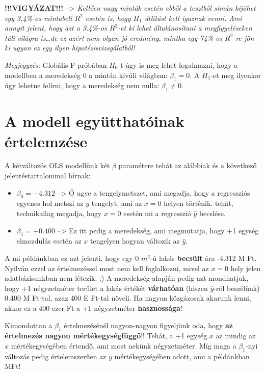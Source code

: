 \documentclass[
]{book}
\providecommand{\tightlist}{%
  \setlength{\itemsep}{0pt}\setlength{\parskip}{0pt}}
\begin{document}
\textbf{!!!VIGYÁZAT!!!} --\textgreater{} \emph{Kellően nagy minták esetén ebből a tesztből simán kijöhet egy 3,4\%-os mintabeli \(R^2\) esetén is, hogy \(H_1\) állítást kell igaznak venni. Ami annyit jelent, hogy azt a 3.4\%-os \(R^2\)-et ki lehet általánosítani a megfigyeléseken túli világra is\ldots de ez azért nem olyan jó eredmény, mintha egy 74\%-os \(R^2\)-re jön ki ugyan ez egy ilyen hipotézisvizsgálatból!}

\emph{Megjegyzés}: Globális F-próbában \(H_0\)-t úgy is meg lehet fogalmazni, hogy a modellben a meredekség 0 a mintán kívüli világban: \(\beta_1=0\). A \(H_1\)-et meg ilyenkor úgy lehetne felírni, hogy a meredekség nem nulla: \(\beta_1\neq0\).

\section{A modell együtthatóinak értelemzése}\label{a-modell-egyuxfctthatuxf3inak-uxe9rtelemzuxe9se}

A kétváltozós OLS modellünk két \(\beta\) paramétere tehát az alábbiak és a következő jelentéstartalommal bírnak:

\begin{itemize}
\tightlist
\item
  \(\beta_0=-4.312\) --\textgreater{} Ő ugye a tengelymetszet, ami megadja, hogy a regressziós egyenes hol metszi az \(y\) tengelyt, ami az \(x=0\) helyen történik. tehát, technikailag megadja, hogy \(x=0\) esetén mi a regresszió \(\hat{y}\) becslése.
\item
  \(\beta_1=+0.400\) --\textgreater{} Ez itt pedig a meredekség, ami megmutatja, hogy +1 egység elmozdulás esetén az \(x\) tengelyen hogyan változik az \(\hat{y}\).
\end{itemize}

A mi példánkban ez azt jelenti, hogy egy 0 \(m^2\)-ú lakás \textbf{becsült} ára -4.312 M Ft. Nyilván ezzel az értelmezéssel most nem kell foglalkozni, mivel az \(x=0\) hely jelen adatbázisunkban nem létezik. :)
A meredekség alapján pedig azt mondhatjuk, hogy +1 négyzetméter terület a lakás értékét \textbf{várhatóan} (hiszen \(\hat{y}\)-ról beszélünk) 0.400 M Ft-tal, azaz 400 E Ft-tal növeli. Ha nagyon közgázosak akarunk lenni, akkor ez a 400 ezer Ft a +1 négyzetméter \textbf{hasznossága}!

Kimondottan a \(\beta_1\) értelmezésénél nagyon-nagyon figyeljünk oda, hogy \textbf{az értelmezés nagyon mértékegységfüggő}!! Tehát, a +1 egység \(x\) az mindig az \(x\) mértékegységében értendő, ami most nekünk négyzetméter. Míg maga a \(\beta_1\)-nyi változás pedig értelemszerűen az \(y\) mértékegységében adott, ami a példánkban MFt!
\end{document}
